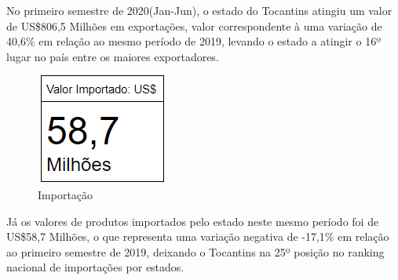 \par No primeiro semestre de 2020(Jan-Jun), o estado do Tocantins atingiu um valor de US\$806,5 Milhões em exportações, valor correspondente à uma variação de 40,6\% em relação ao mesmo período de 2019, levando o estado a atingir o 16º lugar no país entre os maiores exportadores. 

\begin{figure} [h] \caption{Importação}
	\includegraphics[width=\linewidth]{fig/imp1.png}
\end{figure}
	
\par Já os valores de produtos importados pelo estado neste mesmo período foi de US\$58,7 Milhões, o que representa uma variação negativa de -17,1\% em relação ao primeiro semestre de 2019, deixando o Tocantins na 25º posição no ranking nacional de importações por estados.

